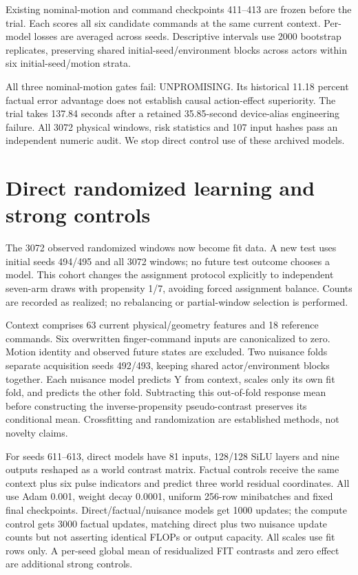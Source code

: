 \documentclass[10 pt]{article}
\begin{document}
Existing nominal-motion and command checkpoints 411--413 are frozen before the
trial. Each scores all six candidate commands at the same current context.
Per-model losses are averaged across seeds. Descriptive intervals use 2000
bootstrap replicates, preserving shared initial-seed/environment blocks across
actors within six initial-seed/motion strata.

\begin{table}[h]
\centering

\caption{Randomized held-window conditional-effect risk differences, mm squared; negative favors the first predictor.}
\end{table}

All three nominal-motion gates fail: UNPROMISING. Its historical 11.18 percent
factual error advantage does not establish causal action-effect superiority.
The trial takes 137.84 seconds after a retained 35.85-second device-alias engineering
failure. All 3072 physical windows, risk statistics and 107 input hashes pass an
independent numeric audit. We stop direct control use of these archived models.

\section{Direct randomized learning and strong controls}
The 3072 observed randomized windows now become fit data. A new test uses initial
seeds 494/495 and all 3072 windows; no future test outcome chooses a model. This
cohort changes the assignment protocol explicitly to independent seven-arm draws
with propensity 1/7, avoiding forced assignment balance. Counts are recorded as
realized; no rebalancing or partial-window selection is performed.

Context comprises 63 current physical/geometry features and 18 reference commands.
Six overwritten finger-command inputs are canonicalized to zero. Motion identity
and observed future states are excluded. Two nuisance folds separate acquisition
seeds 492/493, keeping shared actor/environment blocks together. Each nuisance
model predicts Y from context, scales only its own fit fold, and predicts the
other fold. Subtracting this out-of-fold response mean before constructing the
inverse-propensity pseudo-contrast preserves its conditional mean. Crossfitting
and randomization are established methods, not novelty claims.

For seeds 611--613, direct models have 81 inputs, 128/128 SiLU layers and nine outputs
reshaped as a world contrast matrix. Factual controls receive the same context
plus six pulse indicators and predict three world residual coordinates. All use
Adam 0.001, weight decay 0.0001, uniform 256-row minibatches and fixed final checkpoints.
Direct/factual/nuisance models get 1000 updates; the compute control gets 3000
factual updates, matching direct plus two nuisance update counts but not asserting
identical FLOPs or output capacity. All scales use fit rows only. A per-seed global
mean of residualized FIT contrasts and zero effect are additional strong controls.
\end{document}
